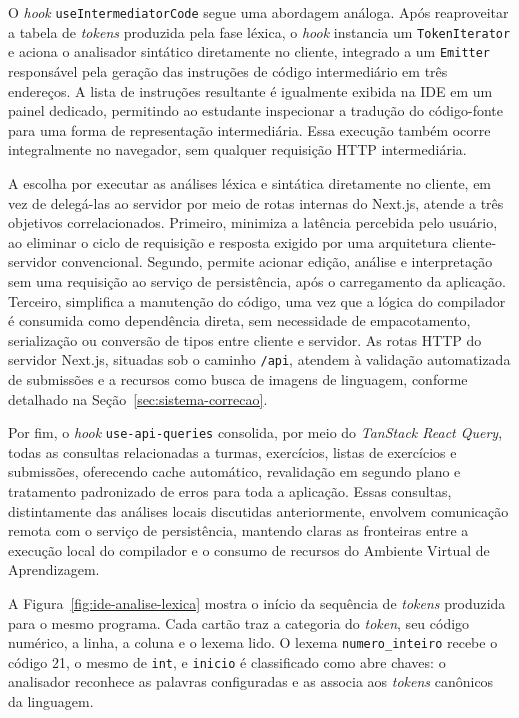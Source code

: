 O \textit{hook} \texttt{useIntermediatorCode} segue uma abordagem análoga. Após reaproveitar a tabela de \textit{tokens} produzida pela fase léxica, o \textit{hook} instancia um \texttt{TokenIterator} e aciona o analisador sintático diretamente no cliente, integrado a um \texttt{Emitter} responsável pela geração das instruções de código intermediário em três endereços. A lista de instruções resultante é igualmente exibida na IDE em um painel dedicado, permitindo ao estudante inspecionar a tradução do código-fonte para uma forma de representação intermediária. Essa execução também ocorre integralmente no navegador, sem qualquer requisição HTTP intermediária.

A escolha por executar as análises léxica e sintática diretamente no cliente, em vez de delegá-las ao servidor por meio de rotas internas do Next.js, atende a três objetivos correlacionados. Primeiro, minimiza a latência percebida pelo usuário, ao eliminar o ciclo de requisição e resposta exigido por uma arquitetura cliente-servidor convencional. Segundo, permite acionar edição, análise e interpretação sem uma requisição ao serviço de persistência, após o carregamento da aplicação. Terceiro, simplifica a manutenção do código, uma vez que a lógica do compilador é consumida como dependência direta, sem necessidade de empacotamento, serialização ou conversão de tipos entre cliente e servidor. As rotas HTTP do servidor Next.js, situadas sob o caminho \texttt{/api}, atendem à validação automatizada de submissões e a recursos como busca de imagens de linguagem, conforme detalhado na Seção~\ref{sec:sistema-correcao}.

Por fim, o \textit{hook} \texttt{use-api-queries} consolida, por meio do \textit{TanStack React Query}, todas as consultas relacionadas a turmas, exercícios, listas de exercícios e submissões, oferecendo cache automático, revalidação em segundo plano e tratamento padronizado de erros para toda a aplicação. Essas consultas, distintamente das análises locais discutidas anteriormente, envolvem comunicação remota com o serviço de persistência, mantendo claras as fronteiras entre a execução local do compilador e o consumo de recursos do Ambiente Virtual de Aprendizagem.

A Figura~\ref{fig:ide-analise-lexica} mostra o início da sequência de \textit{tokens} produzida para o mesmo programa. Cada cartão traz a categoria do \textit{token}, seu código numérico, a linha, a coluna e o lexema lido. O lexema \texttt{numero\_inteiro} recebe o código 21, o mesmo de \texttt{int}, e \texttt{inicio} é classificado como abre chaves: o analisador reconhece as palavras configuradas e as associa aos \textit{tokens} canônicos da linguagem.

